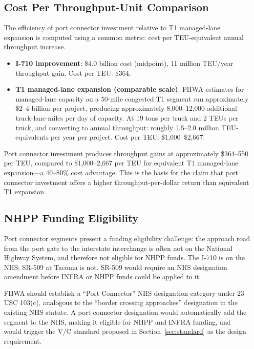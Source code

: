 \subsection{Cost Per Throughput-Unit Comparison}

The efficiency of port connector investment relative to T1 managed-lane expansion is computed using a common metric: cost per TEU-equivalent annual throughput increase.

\begin{itemize}
  \item \textbf{I-710 improvement}: \$4.0 billion cost (midpoint), 11 million TEU/year throughput gain. Cost per TEU: \$364.
  \item \textbf{T1 managed-lane expansion (comparable scale)}: FHWA estimates for managed-lane capacity on a 50-mile congested T1 segment run approximately \$2--4 billion per project, producing approximately 8,000--12,000 additional truck-lane-miles per day of capacity. At 19 tons per truck and 2 TEUs per truck, and converting to annual throughput: roughly 1.5--2.0 million TEU-equivalents per year per project. Cost per TEU: \$1,000--\$2,667.
\end{itemize}

Port connector investment produces throughput gains at approximately \$364--550 per TEU, compared to \$1,000--2,667 per TEU for equivalent T1 managed-lane expansion---a 40--80\% cost advantage. This is the basis for the claim that port connector investment offers a higher throughput-per-dollar return than equivalent T1 expansion.

\subsection{NHPP Funding Eligibility}

Port connector segments present a funding eligibility challenge: the approach road from the port gate to the interstate interchange is often not on the National Highway System, and therefore not eligible for NHPP funds. The I-710 is on the NHS; SR-509 at Tacoma is not. SR-509 would require an NHS designation amendment before INFRA or NHPP funds could be applied to it.

FHWA should establish a ``Port Connector'' NHS designation category under 23 USC 103(c), analogous to the ``border crossing approaches'' designation in the existing NHS statute. A port connector designation would automatically add the segment to the NHS, making it eligible for NHPP and INFRA funding, and would trigger the V/C standard proposed in Section~\ref{sec:standard} as the design requirement.
